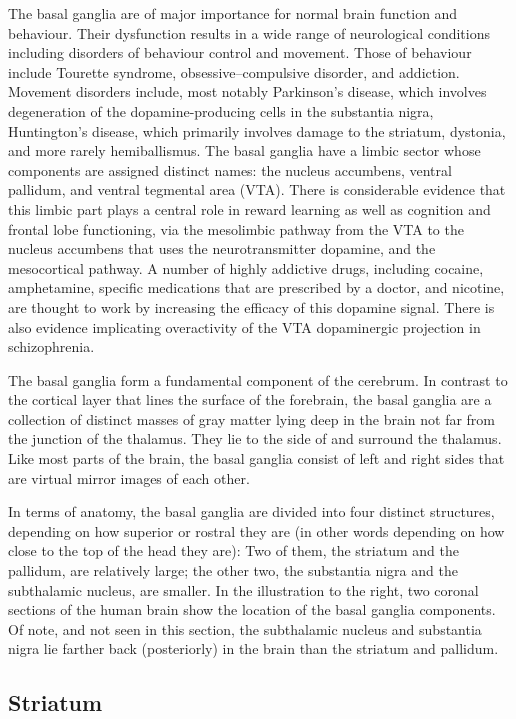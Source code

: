 The basal ganglia are of major importance for normal brain function and behaviour. Their dysfunction results in a wide range of neurological conditions including disorders of behaviour control and movement. Those of behaviour include Tourette syndrome, obsessive--compulsive disorder, and addiction. Movement disorders include, most notably Parkinson's disease, which involves degeneration of the dopamine-producing cells in the substantia nigra, Huntington's disease, which primarily involves damage to the striatum, dystonia, and more rarely hemiballismus. The basal ganglia have a limbic sector whose components are assigned distinct names: the nucleus accumbens, ventral pallidum, and ventral tegmental area (VTA). There is considerable evidence that this limbic part plays a central role in reward learning as well as cognition and frontal lobe functioning, via the mesolimbic pathway from the VTA to the nucleus accumbens that uses the neurotransmitter dopamine, and the mesocortical pathway. A number of highly addictive drugs, including cocaine, amphetamine, specific medications that are prescribed by a doctor, and nicotine, are thought to work by increasing the efficacy of this dopamine signal. There is also evidence implicating overactivity of the VTA dopaminergic projection in schizophrenia.

The basal ganglia form a fundamental component of the cerebrum. In contrast to the cortical layer that lines the surface of the forebrain, the basal ganglia are a collection of distinct masses of gray matter lying deep in the brain not far from the junction of the thalamus. They lie to the side of and surround the thalamus. Like most parts of the brain, the basal ganglia consist of left and right sides that are virtual mirror images of each other.

In terms of anatomy, the basal ganglia are divided into four distinct structures, depending on how superior or rostral they are (in other words depending on how close to the top of the head they are): Two of them, the striatum and the pallidum, are relatively large; the other two, the substantia nigra and the subthalamic nucleus, are smaller. In the illustration to the right, two coronal sections of the human brain show the location of the basal ganglia components. Of note, and not seen in this section, the subthalamic nucleus and substantia nigra lie farther back (posteriorly) in the brain than the striatum and pallidum.

\hypertarget{striatum}{%
\subsection{Striatum}\label{striatum}}

